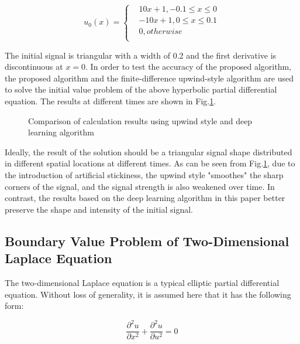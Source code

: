 \documentclass[10pt,journal,compsoc]{IEEEtran}
\begin{document}
\begin{equation}
u_{0}(x) = \left\{
\begin{aligned}
&10x+1,-0.1 \leq x \leq 0 \\
&-10x+1,0 \leq x \leq 0.1 \\
&0,otherwise \\
\end{aligned}
\right.
\label{equ_14}
\end{equation}

The initial signal is triangular with a width of 0.2 and the first derivative is discontinuous at $x=0$. In order to test the accuracy of the proposed algorithm, the proposed algorithm and the finite-difference upwind-style algorithm are used to solve the initial value problem of the above hyperbolic partial differential equation. The results at different times are shown in Fig.\ref{fig_3}.


\begin{figure}[!t]
\centering
{}
\vfil
{}
\centering
\caption{Comparison of calculation results using upwind style and deep learning algorithm}
\label{fig_3}
\end{figure}


Ideally, the result of the solution should be a triangular signal shape distributed in different spatial locations at different times. As can be seen from Fig.\ref{fig_3}, due to the introduction of artificial stickiness\cite{LuJinfu2004}, the upwind style "smoothes" the sharp corners of the signal, and the signal strength is also weakened over time. In contrast, the results based on the deep learning algorithm in this paper better preserve the shape and intensity of the initial signal.


\subsection{Boundary Value Problem of Two-Dimensional Laplace Equation}

The two-dimensional Laplace equation is a typical elliptic partial differential equation. Without loss of generality, it is assumed here that it has the following form:


\begin{equation}
\dfrac{\partial^2 u}{\partial{x^2}} + \dfrac{\partial^2{u}}{\partial{u^2}} = 0
\label{equ_15}
\end{equation}
\end{document}
